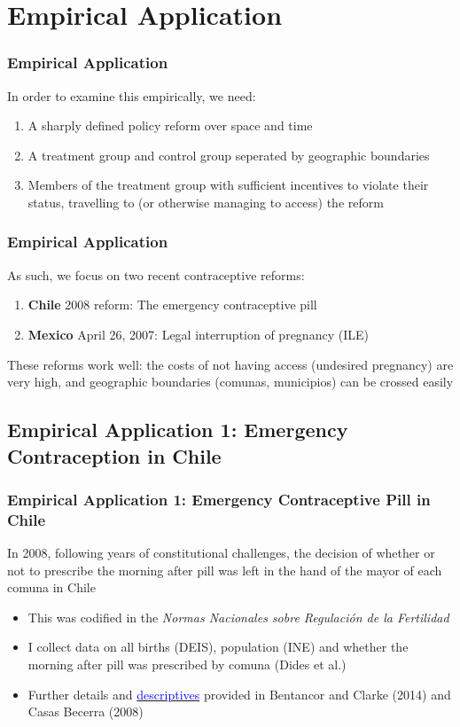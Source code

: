 \documentclass[10pt,letterpaper,subeqn]{beamer}
\begin{document}
\section{Empirical Application}
\begin{frame}[label=empir1]
  \frametitle{Empirical Application}
In order to examine this empirically, we need:
\vspace{4mm}
\begin{enumerate}
\item A sharply defined policy reform over space and time
\item A treatment group and control group seperated by geographic boundaries
\item Members of the treatment group with sufficient incentives to violate their
status, travelling to (or otherwise managing to access) the reform
\end{enumerate}
\end{frame}

\begin{frame}[label=empir2]
  \frametitle{Empirical Application}
As such, we focus on two recent contraceptive reforms:
\vspace{6mm}
\begin{enumerate}
\item \textbf{Chile} 2008 reform: The emergency contraceptive pill
\item \textbf{Mexico} April 26, 2007: Legal interruption of pregnancy (ILE)
\end{enumerate}
\vspace{6mm}
These reforms work well: the costs of not having access (undesired pregnancy) are
very high, and geographic boundaries (comunas, municipios) can be crossed easily
\end{frame}


\subsection{Empirical Application 1: Emergency Contraception in Chile}
\begin{frame}[label=empirA]
  \frametitle{Empirical Application 1: Emergency Contraceptive Pill in Chile} 
In 2008, following years of constitutional challenges, the decision of whether
or not to prescribe the morning after pill was left in the hand of the mayor of
each comuna in Chile
\vspace{5mm}
\begin{itemize}
\item This was codified in the \emph{Normas Nacionales sobre Regulaci\'on de la 
Fertilidad}
\item I collect data on all births (DEIS), population (INE) and whether the 
morning after pill was prescribed by comuna (Dides et al.)
\item Further details and \hyperlink{ChileDesc}{\textcolor{blue}{descriptives}} provided 
in Bentancor and Clarke (2014) and Casas Becerra (2008)
\end{itemize}
\end{frame}
\end{document}

